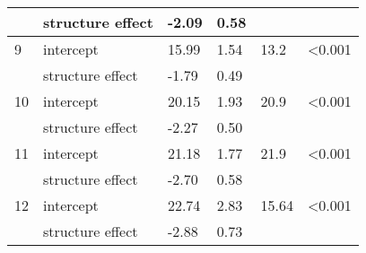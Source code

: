 \documentclass{article}
\begin{document}
\begin{table}[ht]
\begin{tabular}{|p{}|p{}p{}p{}p{}p{}|}
   & structure effect & -2.09 & 0.58 &  &  \\ 
   \hline
  9 & intercept & 15.99 & 1.54 & 13.2 & <0.001 \\ 
   & structure effect & -1.79 & 0.49 &  &  \\ 
   \hline
 10 & intercept & 20.15 & 1.93 & 20.9 & <0.001 \\ 
   & structure effect & -2.27 & 0.50 &  &  \\ 
   \hline
 11 & intercept & 21.18 & 1.77 & 21.9 & <0.001 \\ 
   & structure effect & -2.70 & 0.58 &  &  \\ 
   \hline
 12 & intercept & 22.74 & 2.83 & 15.64 & <0.001 \\ 
   & structure effect & -2.88 & 0.73 &  &  \\ 
   \hline
\end{tabular}
\endgroup
\end{table}    
\clearpage

\end{document}
